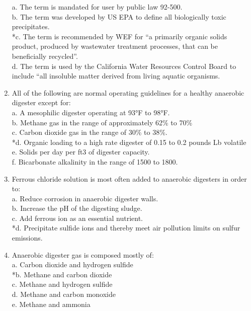 \documentclass{article}
\begin{document}
\begin{enumerate}
a. The term is mandated for user by public law 92-500. \\
b. The term was developed by US EPA to define all biologically toxic precipitates. \\
*c. The term is recommended by WEF for “a primarily organic solids product, produced by wastewater treatment processes, that can be beneficially recycled”. \\
d. The term is used by the California Water Resources Control Board to include “all insoluble matter derived from living aquatic organisms. \\

\item  All of the following are normal operating guidelines for a healthy anaerobic digester except for: \\

a. A mesophilic digester operating at 93°F to 98°F. \\
b. Methane gas in the range of approximately 62\% to 70\% \\
c. Carbon dioxide gas in the range of 30\% to 38\%. \\
*d. Organic loading to a high rate digester of 0.15 to 0.2 pounds Lb volatile \\
e. Solids per day per ft3 of digester capacity. \\
f. Bicarbonate alkalinity in the range of 1500 to 1800. \\

\item  Ferrous chloride solution is most often added to anaerobic digesters in order to: \\

a. Reduce corrosion in anaerobic digester walls. \\
b. Increase the pH of the digesting sludge. \\
c. Add ferrous ion as an essential nutrient. \\
*d. Precipitate sulfide ions and thereby meet air pollution limits on sulfur emissions. \\

\item  Anaerobic digester gas is composed mostly of: \\

a. Carbon dioxide and hydrogen sulfide \\
*b. Methane and carbon dioxide \\
c. Methane and hydrogen sulfide \\
d. Methane and carbon monoxide \\
e. Methane and ammonia \\


\end{enumerate}
\end{document}

